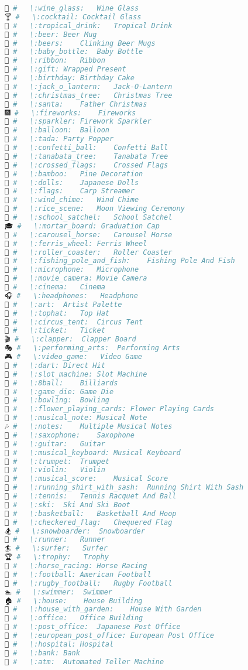 \begin{lstlisting}[language=Julia, style=julia]
🍷 #   \:wine_glass:   Wine Glass
🍸 #   \:cocktail: Cocktail Glass
🍹 #   \:tropical_drink:   Tropical Drink
🍺 #   \:beer: Beer Mug
🍻 #   \:beers:    Clinking Beer Mugs
🍼 #   \:baby_bottle:  Baby Bottle
🎀 #   \:ribbon:   Ribbon
🎁 #   \:gift: Wrapped Present
🎂 #   \:birthday: Birthday Cake
🎃 #   \:jack_o_lantern:   Jack-O-Lantern
🎄 #   \:christmas_tree:   Christmas Tree
🎅 #   \:santa:    Father Christmas
🎆 #   \:fireworks:    Fireworks
🎇 #   \:sparkler: Firework Sparkler
🎈 #   \:balloon:  Balloon
🎉 #   \:tada: Party Popper
🎊 #   \:confetti_ball:    Confetti Ball
🎋 #   \:tanabata_tree:    Tanabata Tree
🎌 #   \:crossed_flags:    Crossed Flags
🎍 #   \:bamboo:   Pine Decoration
🎎 #   \:dolls:    Japanese Dolls
🎏 #   \:flags:    Carp Streamer
🎐 #   \:wind_chime:   Wind Chime
🎑 #   \:rice_scene:   Moon Viewing Ceremony
🎒 #   \:school_satchel:   School Satchel
🎓 #   \:mortar_board: Graduation Cap
🎠 #   \:carousel_horse:   Carousel Horse
🎡 #   \:ferris_wheel: Ferris Wheel
🎢 #   \:roller_coaster:   Roller Coaster
🎣 #   \:fishing_pole_and_fish:    Fishing Pole And Fish
🎤 #   \:microphone:   Microphone
🎥 #   \:movie_camera: Movie Camera
🎦 #   \:cinema:   Cinema
🎧 #   \:headphones:   Headphone
🎨 #   \:art:  Artist Palette
🎩 #   \:tophat:   Top Hat
🎪 #   \:circus_tent:  Circus Tent
🎫 #   \:ticket:   Ticket
🎬 #   \:clapper:  Clapper Board
🎭 #   \:performing_arts:  Performing Arts
🎮 #   \:video_game:   Video Game
🎯 #   \:dart: Direct Hit
🎰 #   \:slot_machine: Slot Machine
🎱 #   \:8ball:    Billiards
🎲 #   \:game_die: Game Die
🎳 #   \:bowling:  Bowling
🎴 #   \:flower_playing_cards: Flower Playing Cards
🎵 #   \:musical_note: Musical Note
🎶 #   \:notes:    Multiple Musical Notes
🎷 #   \:saxophone:    Saxophone
🎸 #   \:guitar:   Guitar
🎹 #   \:musical_keyboard: Musical Keyboard
🎺 #   \:trumpet:  Trumpet
🎻 #   \:violin:   Violin
🎼 #   \:musical_score:    Musical Score
🎽 #   \:running_shirt_with_sash:  Running Shirt With Sash
🎾 #   \:tennis:   Tennis Racquet And Ball
🎿 #   \:ski:  Ski And Ski Boot
🏀 #   \:basketball:   Basketball And Hoop
🏁 #   \:checkered_flag:   Chequered Flag
🏂 #   \:snowboarder:  Snowboarder
🏃 #   \:runner:   Runner
🏄 #   \:surfer:   Surfer
🏆 #   \:trophy:   Trophy
🏇 #   \:horse_racing: Horse Racing
🏈 #   \:football: American Football
🏉 #   \:rugby_football:   Rugby Football
🏊 #   \:swimmer:  Swimmer
🏠 #   \:house:    House Building
🏡 #   \:house_with_garden:    House With Garden
🏢 #   \:office:   Office Building
🏣 #   \:post_office:  Japanese Post Office
🏤 #   \:european_post_office: European Post Office
🏥 #   \:hospital: Hospital
🏦 #   \:bank: Bank
🏧 #   \:atm:  Automated Teller Machine

\end{lstlisting}
